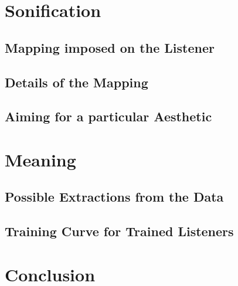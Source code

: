 \documentclass[10pt]{article}
\begin{document}
\section{Sonification}
\subsection{Mapping imposed on the Listener}
\subsection{Details of the Mapping}
\subsection{Aiming for a particular Aesthetic}

\section{Meaning}
\subsection{Possible Extractions from the Data}
\subsection{Training Curve for Trained Listeners}

\section{Conclusion}

\newpage
\clearpage
\pagestyle{empty}

\nocite{*}
\doublespacing
\printbibliography
\end{document}
